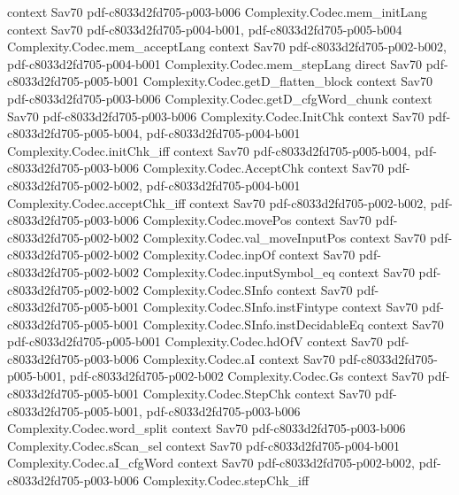 \begin{theorem}
  {context}
  {Sav70}
  {pdf-c8033d2fd705-p003-b006}
\proofstep
  {Complexity.Codec.mem_initLang}
  {context}
  {Sav70}
  {pdf-c8033d2fd705-p004-b001,
    pdf-c8033d2fd705-p005-b004}
\proofstep
  {Complexity.Codec.mem_acceptLang}
  {context}
  {Sav70}
  {pdf-c8033d2fd705-p002-b002,
    pdf-c8033d2fd705-p004-b001}
\proofstep
  {Complexity.Codec.mem_stepLang}
  {direct}
  {Sav70}
  {pdf-c8033d2fd705-p005-b001}
\proofstep
  {Complexity.Codec.getD_flatten_block}
  {context}
  {Sav70}
  {pdf-c8033d2fd705-p003-b006}
\proofstep
  {Complexity.Codec.getD_cfgWord_chunk}
  {context}
  {Sav70}
  {pdf-c8033d2fd705-p003-b006}
\proofstep
  {Complexity.Codec.InitChk}
  {context}
  {Sav70}
  {pdf-c8033d2fd705-p005-b004,
    pdf-c8033d2fd705-p004-b001}
\proofstep
  {Complexity.Codec.initChk_iff}
  {context}
  {Sav70}
  {pdf-c8033d2fd705-p005-b004,
    pdf-c8033d2fd705-p003-b006}
\proofstep
  {Complexity.Codec.AcceptChk}
  {context}
  {Sav70}
  {pdf-c8033d2fd705-p002-b002,
    pdf-c8033d2fd705-p004-b001}
\proofstep
  {Complexity.Codec.acceptChk_iff}
  {context}
  {Sav70}
  {pdf-c8033d2fd705-p002-b002,
    pdf-c8033d2fd705-p003-b006}
\proofstep
  {Complexity.Codec.movePos}
  {context}
  {Sav70}
  {pdf-c8033d2fd705-p002-b002}
\proofstep
  {Complexity.Codec.val_moveInputPos}
  {context}
  {Sav70}
  {pdf-c8033d2fd705-p002-b002}
\proofstep
  {Complexity.Codec.inpOf}
  {context}
  {Sav70}
  {pdf-c8033d2fd705-p002-b002}
\proofstep
  {Complexity.Codec.inputSymbol_eq}
  {context}
  {Sav70}
  {pdf-c8033d2fd705-p002-b002}
\proofstep
  {Complexity.Codec.SInfo}
  {context}
  {Sav70}
  {pdf-c8033d2fd705-p005-b001}
\proofstep
  {Complexity.Codec.SInfo.instFintype}
  {context}
  {Sav70}
  {pdf-c8033d2fd705-p005-b001}
\proofstep
  {Complexity.Codec.SInfo.instDecidableEq}
  {context}
  {Sav70}
  {pdf-c8033d2fd705-p005-b001}
\proofstep
  {Complexity.Codec.hdOfV}
  {context}
  {Sav70}
  {pdf-c8033d2fd705-p003-b006}
\proofstep
  {Complexity.Codec.aI}
  {context}
  {Sav70}
  {pdf-c8033d2fd705-p005-b001,
    pdf-c8033d2fd705-p002-b002}
\proofstep
  {Complexity.Codec.Gs}
  {context}
  {Sav70}
  {pdf-c8033d2fd705-p005-b001}
\proofstep
  {Complexity.Codec.StepChk}
  {context}
  {Sav70}
  {pdf-c8033d2fd705-p005-b001,
    pdf-c8033d2fd705-p003-b006}
\proofstep
  {Complexity.Codec.word_split}
  {context}
  {Sav70}
  {pdf-c8033d2fd705-p003-b006}
\proofstep
  {Complexity.Codec.sScan_sel}
  {context}
  {Sav70}
  {pdf-c8033d2fd705-p004-b001}
\proofstep
  {Complexity.Codec.aI_cfgWord}
  {context}
  {Sav70}
  {pdf-c8033d2fd705-p002-b002,
    pdf-c8033d2fd705-p003-b006}
\proofstep
  {Complexity.Codec.stepChk_iff}

\end{theorem}

